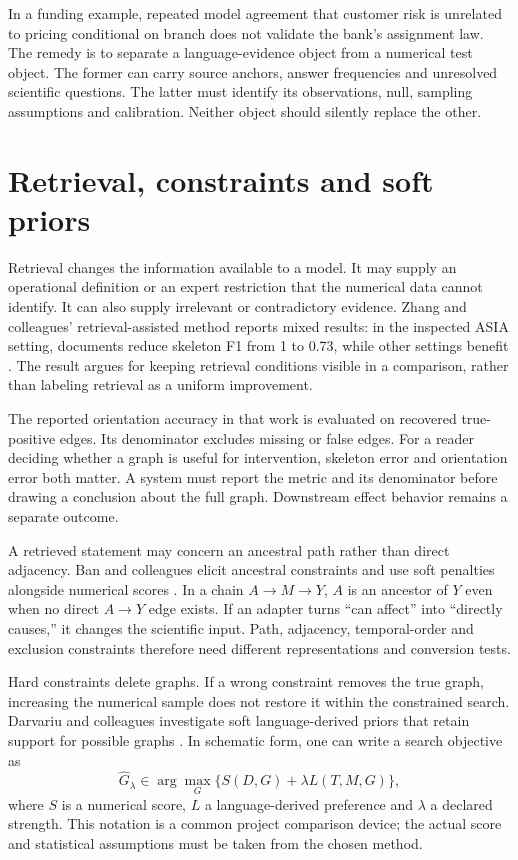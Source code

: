 In a funding example, repeated model agreement that customer risk is unrelated
to pricing conditional on branch does not validate the bank's assignment law.
The remedy is to separate a language-evidence object from a numerical test
object. The former can carry source anchors, answer frequencies and unresolved
scientific questions. The latter must identify its observations, null,
sampling assumptions and calibration. Neither object should silently replace
the other.

\section{Retrieval, constraints and soft priors}

Retrieval changes the information available to a model. It may supply an
operational definition or an expert restriction that the numerical data cannot
identify. It can also supply irrelevant or contradictory evidence. Zhang and
colleagues' retrieval-assisted method reports mixed results: in the inspected
ASIA setting, documents reduce skeleton F1 from 1 to 0.73, while other settings
benefit \cite{v12_la_2402_15301}. The result argues for keeping retrieval
conditions visible in a comparison, rather than labeling retrieval as a
uniform improvement.

The reported orientation accuracy in that work is evaluated on recovered
true-positive edges. Its denominator excludes missing or false edges. For a
reader deciding whether a graph is useful for intervention, skeleton error and
orientation error both matter. A system must report the metric and its
denominator before drawing a conclusion about the full graph. Downstream
effect behavior remains a separate outcome.

A retrieved statement may concern an ancestral path rather than direct
adjacency. Ban and colleagues elicit ancestral constraints and use soft
penalties alongside numerical scores \cite{v12_la_2306_16902}. In a chain
$A\to M\to Y$, $A$ is an ancestor of $Y$ even when no direct $A\to Y$
edge exists. If an adapter turns ``can affect'' into ``directly causes,'' it
changes the scientific input. Path, adjacency, temporal-order and exclusion
constraints therefore need different representations and conversion tests.

Hard constraints delete graphs. If a wrong constraint removes the true graph,
increasing the numerical sample does not restore it within the constrained
search. Darvariu and colleagues investigate soft language-derived priors that
retain support for possible graphs \cite{v12_la_2405_13551}. In schematic
form, one can write a search objective as
\begin{equation}
 \widehat G_\lambda\in\arg\max_G
 \{S(D,G)+\lambda L(T,M,G)\},
 \label{eq:la03-soft-score}
\end{equation}
where $S$ is a numerical score, $L$ a language-derived preference and
$\lambda$ a declared strength. This notation is a common project comparison
device; the actual score and statistical assumptions must be taken from the
chosen method.

